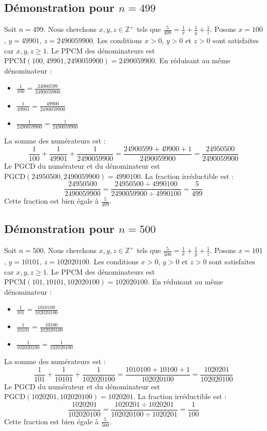 \documentclass[11pt,a4paper]{article}
\begin{document}
\subsection{Démonstration pour $n = 499$}
Soit $n = 499$. Nous cherchons $x, y, z \in \mathbb{Z}^{+}$ tels que $\frac{5}{499} = \frac{1}{x} + \frac{1}{y} + \frac{1}{z}$.
Posons $x = 100$, $y = 49901$, $z = 2490059900$.
Les conditions $x > 0$, $y > 0$ et $z > 0$ sont satisfaites car $x, y, z \geq 1$.
Le PPCM des dénominateurs est $\text{PPCM}(100, 49901, 2490059900) = 2490059900$.
En réduisant au même dénominateur :
\begin{itemize}
    \item $\frac{1}{100} = \frac{24900599}{2490059900}$
    \item $\frac{1}{49901} = \frac{49900}{2490059900}$
    \item $\frac{1}{2490059900} = \frac{1}{2490059900}$
\end{itemize}
La somme des numérateurs est :
$$ \frac{1}{100} + \frac{1}{49901} + \frac{1}{2490059900} = \frac{24900599 + 49900 + 1}{2490059900} = \frac{24950500}{2490059900} $$
Le PGCD du numérateur et du dénominateur est $\text{PGCD}(24950500, 2490059900) = 4990100$.
La fraction irréductible est :
$$ \frac{24950500}{2490059900} = \frac{24950500 \div 4990100}{2490059900 \div 4990100} = \frac{5}{499} $$
Cette fraction est bien égale à $\frac{5}{499}$.

\subsection{Démonstration pour $n = 500$}
Soit $n = 500$. Nous cherchons $x, y, z \in \mathbb{Z}^{+}$ tels que $\frac{5}{500} = \frac{1}{x} + \frac{1}{y} + \frac{1}{z}$.
Posons $x = 101$, $y = 10101$, $z = 102020100$.
Les conditions $x > 0$, $y > 0$ et $z > 0$ sont satisfaites car $x, y, z \geq 1$.
Le PPCM des dénominateurs est $\text{PPCM}(101, 10101, 102020100) = 102020100$.
En réduisant au même dénominateur :
\begin{itemize}
    \item $\frac{1}{101} = \frac{1010100}{102020100}$
    \item $\frac{1}{10101} = \frac{10100}{102020100}$
    \item $\frac{1}{102020100} = \frac{1}{102020100}$
\end{itemize}
La somme des numérateurs est :
$$ \frac{1}{101} + \frac{1}{10101} + \frac{1}{102020100} = \frac{1010100 + 10100 + 1}{102020100} = \frac{1020201}{102020100} $$
Le PGCD du numérateur et du dénominateur est $\text{PGCD}(1020201, 102020100) = 1020201$.
La fraction irréductible est :
$$ \frac{1020201}{102020100} = \frac{1020201 \div 1020201}{102020100 \div 1020201} = \frac{1}{100} $$
Cette fraction est bien égale à $\frac{5}{500}$.
\end{document}
